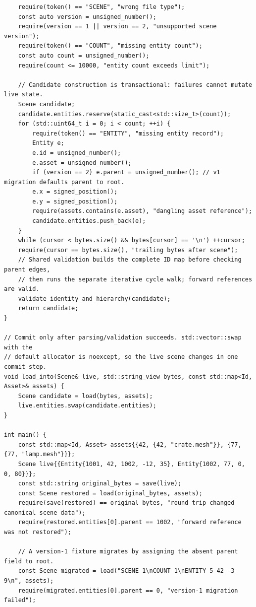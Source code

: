 \begin{verbatim}
    require(token() == "SCENE", "wrong file type");
    const auto version = unsigned_number();
    require(version == 1 || version == 2, "unsupported scene version");
    require(token() == "COUNT", "missing entity count");
    const auto count = unsigned_number();
    require(count <= 10000, "entity count exceeds limit");

    // Candidate construction is transactional: failures cannot mutate live state.
    Scene candidate;
    candidate.entities.reserve(static_cast<std::size_t>(count));
    for (std::uint64_t i = 0; i < count; ++i) {
        require(token() == "ENTITY", "missing entity record");
        Entity e;
        e.id = unsigned_number();
        e.asset = unsigned_number();
        if (version == 2) e.parent = unsigned_number(); // v1 migration defaults parent to root.
        e.x = signed_position();
        e.y = signed_position();
        require(assets.contains(e.asset), "dangling asset reference");
        candidate.entities.push_back(e);
    }
    while (cursor < bytes.size() && bytes[cursor] == '\n') ++cursor;
    require(cursor == bytes.size(), "trailing bytes after scene");
    // Shared validation builds the complete ID map before checking parent edges,
    // then runs the separate iterative cycle walk; forward references are valid.
    validate_identity_and_hierarchy(candidate);
    return candidate;
}

// Commit only after parsing/validation succeeds. std::vector::swap with the
// default allocator is noexcept, so the live scene changes in one commit step.
void load_into(Scene& live, std::string_view bytes, const std::map<Id, Asset>& assets) {
    Scene candidate = load(bytes, assets);
    live.entities.swap(candidate.entities);
}

int main() {
    const std::map<Id, Asset> assets{{42, {42, "crate.mesh"}}, {77, {77, "lamp.mesh"}}};
    Scene live{{Entity{1001, 42, 1002, -12, 35}, Entity{1002, 77, 0, 0, 80}}};
    const std::string original_bytes = save(live);
    const Scene restored = load(original_bytes, assets);
    require(save(restored) == original_bytes, "round trip changed canonical scene data");
    require(restored.entities[0].parent == 1002, "forward reference was not restored");

    // A version-1 fixture migrates by assigning the absent parent field to root.
    const Scene migrated = load("SCENE 1\nCOUNT 1\nENTITY 5 42 -3 9\n", assets);
    require(migrated.entities[0].parent == 0, "version-1 migration failed");


\end{verbatim}
